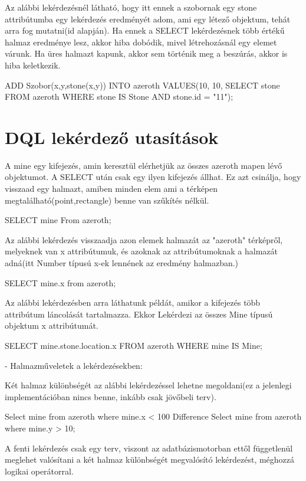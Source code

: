 \begin{sql}
Az alábbi lekérdezésnél látható, hogy itt ennek a szobornak egy stone attribútumba egy lekérdezés eredményét adom, ami egy létező objektum, tehát arra fog mutatni(id alapján).
Ha ennek a SELECT lekérdezésnek több értékű halmaz eredménye lesz, akkor hiba dobódik, mivel létrehozásnál egy elemet várunk. Ha üres halmazt kapunk, akkor sem történik meg a beszúrás, akkor is hiba keletkezik.
\begin{sql}
ADD Szobor(x,y,stone(x,y)) INTO azeroth VALUES(10, 10, SELECT stone FROM azeroth WHERE stone IS Stone AND stone.id = "11");
\end{sql}


\section{DQL lekérdező utasítások}


A mine egy kifejezés, amin keresztül elérhetjük az összes  azeroth mapen lévő objektumot. A SELECT után csak egy ilyen kifejezés állhat. Ez azt csinálja, hogy visszaad egy halmazt, amiben minden elem ami a térképen megtalálható(point,rectangle) benne van szűkítés nélkül.
\begin{sql}
SELECT mine From azeroth;
\end{sql}


Az alábbi lekérdezés visszaadja azon elemek halmazát az "azeroth" térképről, melyeknek van x attribútumuk, és azoknak az attribútumoknak a halmazát adná(itt Number típusú x-ek lennének az eredmény halmazban.)
\begin{sql}
SELECT mine.x from azeroth;
\end{sql}


Az alábbi lekérdezésben arra láthatunk példát, amikor a kifejezés több attribútum láncolását tartalmazza. Ekkor Lekérdezi az összes Mine típusú objektum x attribútumát.
\begin{sql}
SELECT mine.stone.location.x FROM azeroth WHERE mine IS Mine;
\end{sql}


- Halmazműveletek a lekérdezésekben:

Két halmaz különbségét az alábbi lekérdezéssel lehetne megoldani(ez a jelenlegi implementációban nincs benne, inkább csak jövőbeli terv).
\begin{sql}
Select mine from azeroth where mine.x < 100 Difference Select mine from azeroth where mine.y > 10; 
\end{sql}

A fenti lekérdezés csak egy terv, viszont az adatbázismotorban ettől függetlenül meglehet valósítani a két halmaz különbségét megvalósító lekérdezést, méghozzá logikai operátorral.


\end{sql}
